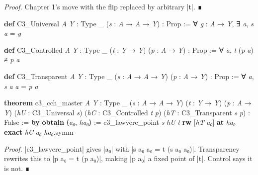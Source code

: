 \documentclass{memoir}
\begin{document}
\emph{Proof.} Chapter 1's move with the flip replaced by arbitrary \LeanVerb|t|. ∎

\begin{LeanVerbatim}
\textbf{def} C3_Universal \textit{A} \textit{Y} : Type _ (\textit{s} : \textit{A} → \textit{A} → \textit{Y}) : Prop :=
  ∀ \textit{g} : \textit{A} → \textit{Y}, ∃ \textit{a}, \textit{s} \textit{a} = \textit{g}

\textbf{def} C3_Controlled \textit{A} \textit{Y} : Type _ (\textit{t} : \textit{Y} → \textit{Y})
    (\textit{p} : \textit{A} → \textit{Y}) : Prop :=
  ∀ \textit{a}, \textit{t} (\textit{p} \textit{a}) ≠ \textit{p} \textit{a}

\textbf{def} C3_Transparent \textit{A} \textit{Y} : Type _ (\textit{s} : \textit{A} → \textit{A} → \textit{Y})
    (\textit{p} : \textit{A} → \textit{Y}) : Prop :=
  ∀ \textit{a}, \textit{s} \textit{a} \textit{a} = \textit{p} \textit{a}

\textbf{theorem} c3_cch_master \textit{A} \textit{Y} : Type _ (\textit{s} : \textit{A} → \textit{A} → \textit{Y})
    (\textit{t} : \textit{Y} → \textit{Y}) (\textit{p} : \textit{A} → \textit{Y})
    (\textit{hU} : C3_Universal \textit{s}) (\textit{hC} : C3_Controlled \textit{t} \textit{p})
    (\textit{hT} : C3_Transparent \textit{s} \textit{p}) :
    False := \textbf{by}
  \textbf{obtain} ⟨\textit{a₀}, \textit{ha₀}⟩ := c3_lawvere_point \textit{s} \textit{hU} \textit{t}
  \textbf{rw} [\textit{hT} \textit{a₀}] \textbf{at} \textit{ha₀}
  \textbf{exact} \textit{hC} \textit{a₀} \textit{ha₀}.symm

\end{LeanVerbatim}


\emph{Proof.} \LeanVerb|c3_lawvere_point| gives \LeanVerb|a₀| with \LeanVerb|s a₀ a₀ = t (s a₀ a₀)|.
Transparency rewrites this to \LeanVerb|p a₀ = t (p a₀)|, making \LeanVerb|p a₀| a fixed point of
\LeanVerb|t|. Control says it is not. ∎
\end{document}
